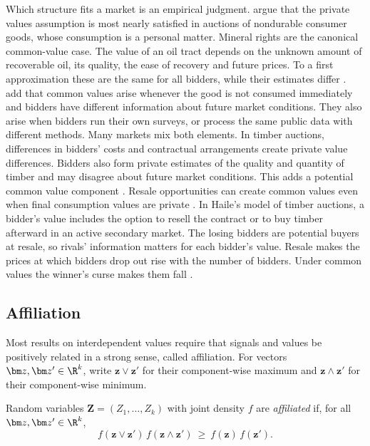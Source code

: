 Which structure fits a market is an empirical judgment. \citet[p.~1093]{MilgromWeber1982} argue that the
private values assumption is most nearly satisfied in auctions of nondurable consumer goods, whose
consumption is a personal matter. Mineral rights are the canonical common-value case. The value of an oil
tract depends on the unknown amount of recoverable oil, its quality, the ease of recovery and future
prices. To a first approximation these are the same for all bidders, while their estimates differ \citep[pp.~1093--1094]{MilgromWeber1982}.
\citet[Section~7]{AtheyHaile2007} add that common values arise whenever the good is not consumed
immediately and bidders have different information about future market conditions. They also arise when
bidders run their own surveys, or process the same public data with different methods. Many markets mix
both elements. In timber auctions, differences in bidders' costs and contractual arrangements create
private value differences. Bidders also form private estimates of the quality and quantity of timber and
may disagree about future market conditions. This adds a potential common value component
\citep[Section~II.F]{AtheyLevinSeira2011}. Resale opportunities can create common values even when final
consumption values are private \citep{Haile2001}. In Haile's model of timber auctions, a bidder's value
includes the option to resell the contract or to buy timber afterward in an active secondary market.
The losing bidders are potential buyers at resale, so rivals' information matters for each bidder's
value. Resale makes the prices at which bidders drop out rise with the number of bidders. Under common
values the winner's curse makes them fall \citep[Section~2.6.4, p.~100]{HortacsuPerrigne2021}.

\subsection{Affiliation}\label{sec:14-affiliation}

Most results on interdependent values require that signals and values be positively related in a strong
sense, called affiliation. For vectors $\bm z,\bm z'\in\R^k$, write $\bm z\vee\bm z'$ for their
component-wise maximum and $\bm z\wedge\bm z'$ for their component-wise minimum.

\begin{definition}[Affiliation]\label{def:14-affiliation}
Random variables $\bm Z=(Z_1,\dots,Z_k)$ with joint density $f$ are \emph{affiliated} if, for all
$\bm z,\bm z'\in\R^k$,
\begin{equation}\label{eq:14-affil-ineq}
f(\bm z\vee\bm z')\,f(\bm z\wedge\bm z')\ \ge\ f(\bm z)\,f(\bm z').
\end{equation}
\end{definition}


